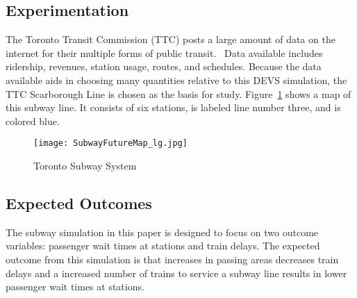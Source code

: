 \subsection{Experimentation}\label{section:experiment_setup}
The Toronto Transit Commission (TTC) posts a large amount of data on the internet for their multiple forms of public transit.~\cite{ttcdata} Data available includes ridership, revenues, station usage, routes, and schedules.  Because the data available aids in choosing many quantities relative to this DEVS simulation, the TTC Scarborough Line is chosen as the basis for study.  Figure~\ref{fig:subwaymap} shows a map of this subway line.  It consists of six stations, is labeled line number three, and is colored blue.
%
\begin{figure}[htb]
	\centering
	\texttt{[image: SubwayFutureMap\_lg.jpg]}
	\caption{Toronto Subway System~\cite{ttcmap}}
	\label{fig:subwaymap}
\end{figure}



\subsection{Expected Outcomes}

The subway simulation in this paper is designed to focus on two outcome variables: passenger wait times at stations and train delays. The expected outcome from this simulation is that increases in passing areas decreases train delays and a increased number of trains to service a subway line results in lower passenger wait times at stations.